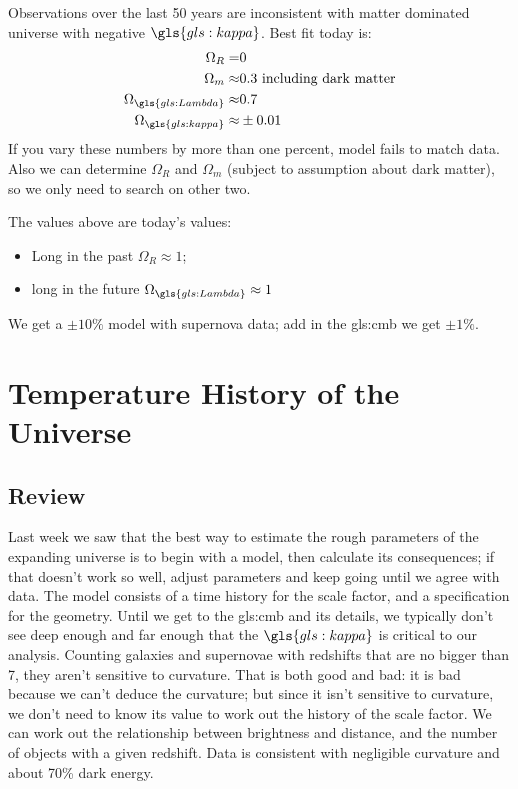 \documentclass[]{article}
\begin{document}
 Observations over the last 50 years are inconsistent with matter dominated universe with negative $\gls{gls:kappa}$. Best fit today is:
 \begin{align*}
 	\Omega_R=&0\\
 	\Omega_m\approx&0.3 \text{ including dark matter}\\
 	\Omega_{\gls{gls:Lambda}}\approx&0.7\\
 	\Omega_{\gls{gls:kappa}}\approx&\pm0.01\\
 \end{align*}
If you vary these numbers by more than one percent, model fails to match data. Also we can determine $\Omega_R$ and $\Omega_m$ (subject to assumption about dark matter), so we only need to search on other two.

The values above are today's values:
\begin{itemize}
	\item Long in the past $\Omega_R\approx1$; 
	\item long in the future $\Omega_{\gls{gls:Lambda}}\approx1$
\end{itemize} 


We get a $\pm 10\%$ model with supernova data; add in the \gls{gls:cmb} we get $\pm 1\%$.

\section{Temperature History of the Universe}

\subsection{Review}
Last week we saw that the best way to estimate the rough parameters of the expanding universe is to begin with a model, then calculate its consequences; if that doesn't work so well, adjust parameters and keep going until we agree with data. The model consists of a time history for the scale factor, and a specification for the geometry. Until we get to the \gls{gls:cmb} and its details, we typically don't see deep enough and far enough that the $\gls{gls:kappa}$ is critical to our analysis. Counting galaxies and supernovae with redshifts that are no bigger than 7, they aren't sensitive to curvature. That is both good and bad: it is bad because we can't deduce the curvature; but since it isn't sensitive to curvature, we don't need to know its value to work out the history of the scale factor. We can work out the relationship between brightness and distance, and the number of objects with a given redshift. Data is consistent with negligible curvature and about 70\% dark energy.
\end{document}
